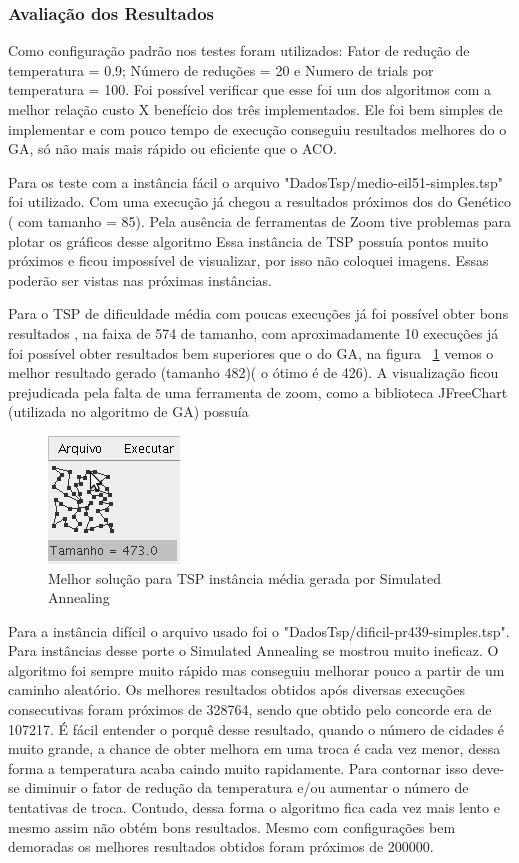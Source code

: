 \documentclass{acm_proc_article-sp}
\begin{document}
\subsubsection{Avaliação dos Resultados}
Como configuração padrão nos testes foram utilizados: Fator de redução de temperatura = 0.9; Número de reduções = 20 e Numero de trials por temperatura = 100. Foi possível verificar que esse foi um dos algoritmos com a melhor relação custo X benefício dos três implementados. Ele foi bem simples de implementar e com pouco tempo de execução conseguiu resultados melhores do o GA, só não mais mais rápido ou eficiente que o ACO.

Para os teste com a instância fácil o arquivo "DadosTsp/medio-eil51-simples.tsp" foi utilizado. Com uma execução já chegou a resultados próximos dos do Genético ( com tamanho = 85). Pela ausência de ferramentas de Zoom tive problemas para plotar os gráficos desse algoritmo Essa instância de TSP possuía pontos muito próximos e ficou impossível de visualizar, por isso não coloquei imagens. Essas poderão ser vistas nas próximas instâncias.

Para o TSP de dificuldade média com poucas execuções já foi possível obter bons resultados , na faixa de 574 de tamanho, com aproximadamente 10 execuções já foi possível obter resultados bem superiores que o do GA, na figura ~\ref{fig:medioSimAn} vemos o melhor resultado gerado (tamanho 482)( o ótimo é de 426). A visualização ficou prejudicada pela falta de uma ferramenta de zoom, como a biblioteca JFreeChart (utilizada no algoritmo de GA) possuía

\begin{figure}[ht]
 \begin{center}
  \includegraphics[scale=0.8]{imagens/medio_SimAn.png} 
  \caption{Melhor solução para TSP instância média gerada por Simulated Annealing}
  \label{fig:medioSimAn}
 \end{center}
\end{figure}

Para a instância difícil o arquivo usado foi o "DadosTsp/dificil-pr439-simples.tsp". Para instâncias desse porte o Simulated Annealing se mostrou muito ineficaz. O algoritmo foi sempre muito rápido mas conseguiu melhorar pouco a partir de um caminho aleatório. Os melhores resultados obtidos após diversas execuções consecutivas foram próximos de 328764, sendo que obtido pelo concorde era de 107217. É fácil entender o porquê desse resultado, quando o número de cidades é muito grande, a chance de obter melhora em uma troca é cada vez menor, dessa forma a temperatura acaba caindo muito rapidamente. Para contornar isso deve-se diminuir o fator de redução da temperatura e/ou aumentar o número de tentativas de troca. Contudo, dessa forma o algoritmo fica cada vez mais lento e mesmo assim não obtém bons resultados. Mesmo com configurações bem demoradas os melhores resultados obtidos foram próximos de 200000.
\end{document}
